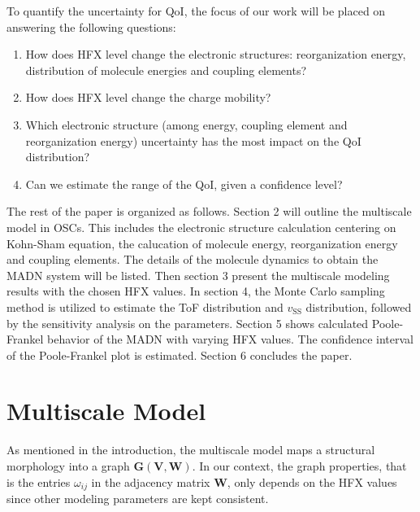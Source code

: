 \documentclass[%
 reprint,
 amsmath,amssymb,
 aps,
]{revtex4-2}
\begin{document}
To quantify the uncertainty for QoI, the focus of our work will be placed on answering the following questions: 
\begin{enumerate}
    \item How does HFX level change the electronic structures: reorganization energy, distribution of molecule energies and coupling elements? 
    \item How does HFX level change the charge mobility?
    \item Which electronic structure (among energy, coupling element and reorganization energy) uncertainty has the most impact on the QoI distribution?
    \item Can we estimate the range of the QoI, given a confidence level?
\end{enumerate}

The rest of the paper is organized as follows. Section 2 will outline the multiscale model in OSCs. This includes the electronic structure calculation centering on Kohn-Sham equation, the calucation of molecule energy, reorganization energy and coupling elements. The details of the molecule dynamics to obtain the MADN system will be listed.
Then section 3 present the multiscale modeling results with the chosen HFX values. In section 4, the Monte Carlo sampling method is utilized to estimate the ToF distribution and $v_\text{SS}$ distribution, followed by the sensitivity analysis on the parameters. 
Section 5 shows calculated Poole-Frankel behavior of the MADN with varying HFX values. The confidence interval of the Poole-Frankel plot is estimated. Section 6 concludes the paper. 
\section{Multiscale Model}
As mentioned in the introduction, the multiscale model maps a structural morphology into a graph $\mathbf{G}(\mathbf{V}, \mathbf{W})$. In our context, the graph properties, that is the entries $\omega_{ij}$ in the adjacency matrix $\mathbf{W}$, only depends on the HFX values since other modeling parameters are kept consistent. 
\end{document}
